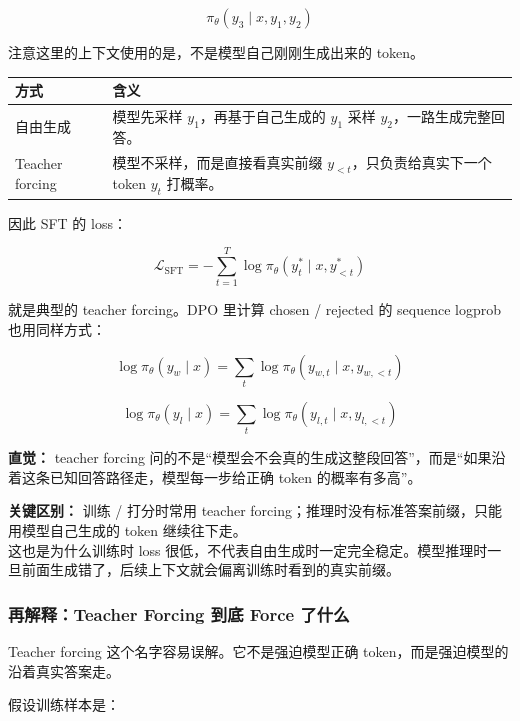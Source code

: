 \[
\pi_\theta(y_3 \mid x, y_1, y_2)
\]

注意这里的上下文使用的是，不是模型自己刚刚生成出来的 token。

\begin{center}
{\small
\begin{tabular}{p{3.4cm}p{9.4cm}}
\hline
\textbf{方式} & \textbf{含义} \\
\hline
自由生成
&
模型先采样 $y_1$，再基于自己生成的 $y_1$ 采样 $y_2$，一路生成完整回答。
\\
Teacher forcing
&
模型不采样，而是直接看真实前缀 $y_{<t}$，只负责给真实下一个 token $y_t$ 打概率。
\\
\hline
\end{tabular}
}
\end{center}

因此 SFT 的 loss：

\[
\mathcal{L}_\text{SFT}
=
-
\sum_{t=1}^{T}
\log \pi_\theta(y_t^\ast \mid x, y_{<t}^\ast)
\]

就是典型的 teacher forcing。DPO 里计算 chosen / rejected 的 sequence logprob 也用同样方式：

\[
\log \pi_\theta(y_w \mid x)
=
\sum_t
\log \pi_\theta(y_{w,t} \mid x, y_{w,<t})
\]

\[
\log \pi_\theta(y_l \mid x)
=
\sum_t
\log \pi_\theta(y_{l,t} \mid x, y_{l,<t})
\]

\begin{intubox}
\textbf{直觉：} teacher forcing 问的不是“模型会不会真的生成这整段回答”，而是“如果沿着这条已知回答路径走，模型每一步给正确 token 的概率有多高”。
\end{intubox}

\begin{warnbox}
\textbf{关键区别：} 训练 / 打分时常用 teacher forcing；推理时没有标准答案前缀，只能用模型自己生成的 token 继续往下走。\\
这也是为什么训练时 loss 很低，不代表自由生成时一定完全稳定。模型推理时一旦前面生成错了，后续上下文就会偏离训练时看到的真实前缀。
\end{warnbox}

\subsubsection{再解释：Teacher Forcing 到底 Force 了什么}

Teacher forcing 这个名字容易误解。它不是强迫模型正确 token，而是强迫模型的沿着真实答案走。

假设训练样本是：


